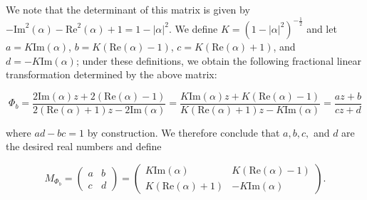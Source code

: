 \begin{solution}
  We note that the determinant of this matrix is given by 
  $-\text{Im}^2(\alpha) - \text{Re}^2(\alpha) + 1 = 1 - |\alpha|^2$. We define
  $K = \left(1 - |\alpha|^2\right)^{-\frac{1}{2}}$ and let $a = K \text{Im}(\alpha)$, $b = K(\text{Re}(\alpha) - 1)$,
  $c = K(\text{Re}(\alpha) + 1)$, and $d = -K \text{Im}(\alpha)$; under these definitions, we obtain the following 
  fractional linear transformation determined by the above matrix:

  $$
  \Phi_b = \frac{2 \text{Im}(\alpha)z + 2(\text{Re}(\alpha) - 1)}{2(\text{Re}(\alpha) + 1)z - 2\text{Im}(\alpha)}
         = \frac{K \text{Im}(\alpha)z + K(\text{Re}(\alpha) - 1)}{K(\text{Re}(\alpha) + 1)z - K\text{Im}(\alpha)}
         = \frac{az + b}{cz + d}
  $$

  where $ad - bc = 1$ by construction. We therefore conclude that $a, b, c,$ and $d$ are the desired real numbers and 
  define

  $$
  M_{\Phi_b} = \begin{pmatrix}
    a & b \\
    c & d
  \end{pmatrix} = \begin{pmatrix}
    K \text{Im}(\alpha) & K(\text{Re}(\alpha) - 1) \\
    K(\text{Re}(\alpha) + 1) & -K \text{Im}(\alpha)
  \end{pmatrix}.
  $$
  \ \\
\end{solution}